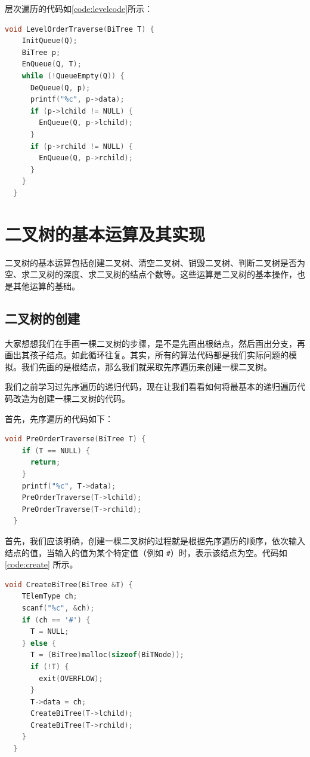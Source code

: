 \documentclass[lang=cn,newtx,10pt,scheme=chinese]{elegantbook}
\begin{document}
层次遍历的代码如\ref{code:levelcode}所示：

\begin{lstlisting}[language=C++, caption={层次遍历}, label={code:levelcode}]
  void LevelOrderTraverse(BiTree T) {
    InitQueue(Q);
    BiTree p;
    EnQueue(Q, T);
    while (!QueueEmpty(Q)) {
      DeQueue(Q, p);
      printf("%c", p->data);
      if (p->lchild != NULL) {
        EnQueue(Q, p->lchild);
      }
      if (p->rchild != NULL) {
        EnQueue(Q, p->rchild);
      }
    }
  }
\end{lstlisting}



\section{二叉树的基本运算及其实现}
二叉树的基本运算包括创建二叉树、清空二叉树、销毁二叉树、判断二叉树是否为空、求二叉树的深度、求二叉树的结点个数等。这些运算是二叉树的基本操作，也是其他运算的基础。
\subsection{二叉树的创建}

大家想想我们在手画一棵二叉树的步骤，是不是先画出根结点，然后画出分支，再画出其孩子结点。如此循环往复。其实，所有的算法代码都是我们实际问题的模拟。我们先画的是根结点，那么我们就采取先序遍历来创建一棵二叉树。

我们之前学习过先序遍历的递归代码，现在让我们看看如何将最基本的递归遍历代码改造为创建一棵二叉树的代码。

首先，先序遍历的代码如下：

\begin{lstlisting}[language=C++, caption={先序遍历}]
  void PreOrderTraverse(BiTree T) {
    if (T == NULL) {
      return;
    }
    printf("%c", T->data);
    PreOrderTraverse(T->lchild);
    PreOrderTraverse(T->rchild);
  }
\end{lstlisting}

首先，我们应该明确，创建一棵二叉树的过程就是根据先序遍历的顺序，依次输入结点的值，当输入的值为某个特定值（例如 \texttt{\#}）时，表示该结点为空。代码如 \ref{code:create} 所示。

\begin{lstlisting}[language=C++, caption={创建二叉树}, label={code:create}]
  void CreateBiTree(BiTree &T) {
    TElemType ch;
    scanf("%c", &ch);
    if (ch == '#') {
      T = NULL;
    } else {
      T = (BiTree)malloc(sizeof(BiTNode));
      if (!T) {
        exit(OVERFLOW);
      }
      T->data = ch;
      CreateBiTree(T->lchild);
      CreateBiTree(T->rchild);
    }
  }
\end{lstlisting}
\end{document}
